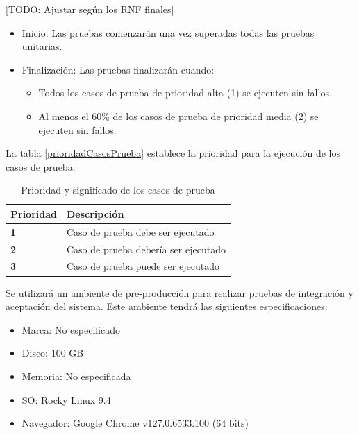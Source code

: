 [TODO: Ajustar según los RNF finales]


\begin{itemize}
    \item Inicio: Las pruebas comenzarán una vez superadas todas las pruebas unitarias.
    \item Finalización: Las pruebas finalizarán cuando:
    \begin{itemize}
        \item Todos los casos de prueba de prioridad alta (1) se ejecuten sin fallos.
        \item Al menos el 60\% de los casos de prueba de prioridad media (2) se ejecuten sin fallos.
    \end{itemize}
\end{itemize}

La tabla \ref{prioridadCasosPrueba} establece la prioridad para la ejecución de los casos de prueba:

\begin{table}[H]
    \centering
    \begin{tabular}{p{3cm} p{10cm}}
    \hline
    \rowcolor[HTML]{C0C0C0} 
    \textbf{Prioridad} & \textbf{Descripción}                                                                                     \\ \hline
    \textbf{1} & Caso de prueba debe ser ejecutado \\ \hline
    \textbf{2} & Caso de prueba debería ser ejecutado         \\ \hline
    \textbf{3} & Caso de prueba puede ser ejecutado \\ \hline
    \end{tabular}
    \caption{Prioridad y significado de los casos de prueba}
    \label{tab:prioridadCasosPrueba}
\end{table}

Se utilizará un ambiente de pre-producción para realizar pruebas de integración y aceptación del sistema. Este ambiente tendrá las siguientes
especificaciones:

\begin{itemize}
    \item Marca: No especificado
    \item Disco: 100 GB
    \item Memoria: No especificada
    \item SO: Rocky Linux 9.4
    \item Navegador: Google Chrome v127.0.6533.100 (64 bits)
\end{itemize}

